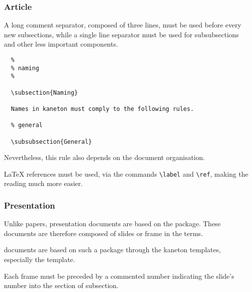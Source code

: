 
\subsubsection{Article}

A long comment separator, composed of three lines, must be used before
every new subsections, while a single line separator must be used for
subsubsections and other less important components.

\begin{verbatim}
  %
  % naming
  %

  \subsection{Naming}

  Names in kaneton must comply to the following rules.

  % general

  \subsubsection{General}
\end{verbatim}

Nevertheless, this rule also depends on the document organisation.

{\LaTeX} references must be used, via the commands \verb|\label| and
\verb|\ref|, making the reading much more easier.


\subsubsection{Presentation}

Unlike papers, presentation documents are based on the  package.
These documents are therefore composed of slides or frame in the
 terms.

 documents are based on such a package through the kaneton
templates, especially the  template.

Each frame must be preceded by a commented number indicating the slide's
number into the section of subsection.


